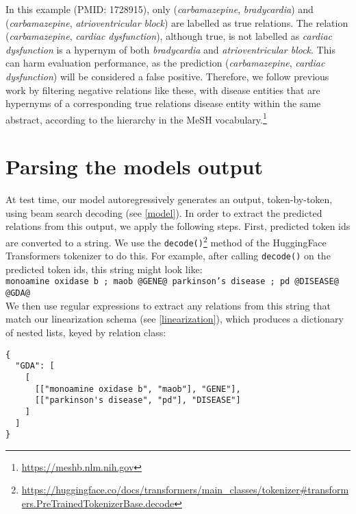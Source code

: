 \documentclass[11pt]{article}
\begin{document}
\noindent In this example (PMID: 1728915), only (\textit{carbamazepine}, \textit{bradycardia}) and (\textit{carbamazepine}, \textit{atrioventricular block}) are labelled as true relations. The relation (\textit{carbamazepine}, \textit{cardiac dysfunction}), although true, is not labelled as \textit{cardiac dysfunction} is a hypernym of both \textit{bradycardia} and \textit{atrioventricular block}. This can harm evaluation performance, as the prediction (\textit{carbamazepine}, \textit{cardiac dysfunction}) will be considered a false positive. Therefore, we follow previous work \citep{Gu2016ChemicalinducedDR, Gu2017ChemicalinducedDR, Verga2018SimultaneouslyST, christopoulou-etal-2019-connecting, zhou2021document} by filtering negative relations like these, with disease entities that are hypernyms of a corresponding true relations disease entity within the same abstract, according to the hierarchy in the MeSH vocabulary.\footnote{\url{https://meshb.nlm.nih.gov}}

\section{Parsing the models output}
\label{appendix:parsing-model-output}

At test time, our model autoregressively generates an output, token-by-token, using beam search decoding (see \textsection\ref{model}). In order to extract the predicted relations from this output, we apply the following steps. First, predicted token ids are converted to a string. We use the \texttt{decode()}\footnote{\url{https://huggingface.co/docs/transformers/main_classes/tokenizer\#transformers.PreTrainedTokenizerBase.decode}} method of the HuggingFace Transformers tokenizer \citep{hf-transformers} to do this. For example, after calling \texttt{decode()} on the predicted token ids, this string might look like:\\

\noindent
{\small
\texttt{monoamine oxidase b ; maob @GENE@ parkinson's disease ; pd @DISEASE@ @GDA@}
}\\

\noindent We then use regular expressions to extract any relations from this string that match our linearization schema (see \textsection\ref{linearization}), which produces a dictionary of nested lists, keyed by relation class:\\

\noindent
{\small
\begin{verbatim}
{
  "GDA": [
    [
      [["monoamine oxidase b", "maob"], "GENE"],
      [["parkinson's disease", "pd"], "DISEASE"]
    ]
  ]
}
\end{verbatim}
}
\end{document}
